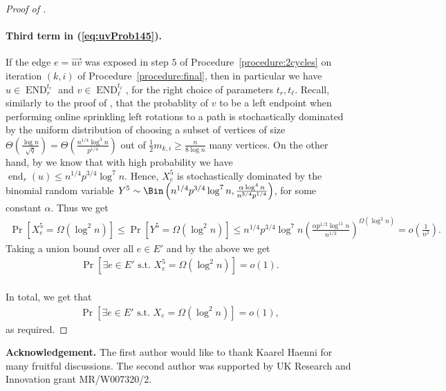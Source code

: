 \documentclass{article}
\DeclareMathOperator{\END}{END}
\DeclareMathOperator{\e}{end}
\begin{document}
\begin{proof}[Proof of ]
		\paragraph*{Third term in (\ref{eq:uvProb145}).}
		If the edge $e = \overrightarrow{uv}$ was exposed in step $5$ of Procedure~\ref{procedure:2cycles} on iteration $(k,i)$ of Procedure~\ref{procedure:final}, then in particular we have $u \in \END_r^{t_r}$ and $v\in \END_{\ell}^{t_{\ell}}$, for the right choice of parameters $t_r, t_{\ell}$.
		Recall, similarly to the proof of , that the probablity of $v$ to be a left endpoint when performing online sprinkling left rotations to a path is stochastically dominated by the uniform distribution of choosing a subset of vertices of size $\Theta\left(\frac{\log n}{\sqrt{q}} \right) = \Theta\left(\frac{n^{1/4}\log^3 n}{p^{1/4}} \right)$ out of $\frac{1}{2}m_{k,i} \ge \frac{n}{8\log n}$ many vertices.
		On the other hand, by  we know that with high probability we have $\e_r(u) \le n^{1/4}p^{3/4}\log^7 n$.
		Hence, $X^5_e$ is stochastically dominated by the binomial random variable $Y^5 \sim \Bin\left(n^{1/4}p^{3/4}\log^7 n, \frac{\alpha \log^4 n}{n^{3/4}p^{1/4}} \right)$, for some constant $\alpha$.
		Thus we get
		\begin{align*}
		\Pr\left[X^5_e = \Omega(\log^2 n) \right] \le  \Pr\left[Y^5 = \Omega(\log^2 n) \right]
		\le n^{1/4}p^{3/4}\log^7 n \left(\tfrac{\alpha p^{1/2}\log^{11}n}{n^{1/2}} \right)^{\Omega(\log^2 n)} =o\left(\tfrac{1}{n^2} \right).
		\end{align*}
		Taking a union bound over all $e \in E'$ and by the above we get
		\begin{align*}
		\Pr\left[\exists e \in E' \text{ s.t. } X^5_e = \Omega(\log^2 n) \right] = o(1).
		\end{align*}
		\\
		
		In total, we get that
		\begin{align*}
		\Pr\left[\exists e \in E' \text{ s.t. } X_e = \Omega(\log^2 n) \right] = o(1),
		\end{align*}
		as required.
	\end{proof}
\vspace{20pt}
{\bf Acknowledgement.} The first author would like to thank Kaarel Haenni for many fruitful discussions.
The second author was supported by UK Research and Innovation grant MR/W007320/2.
	


\end{document}
